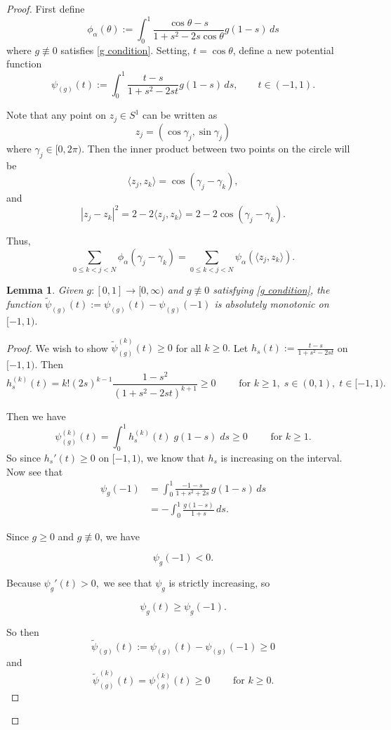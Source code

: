 \documentclass{article}
\newtheorem{lemma}[theorem]{Lemma}
\begin{document}
\begin{proof}
First define
\[
\phi_\alpha(\theta)
:=\int_0^1
\frac{\cos\theta-s}{1+s^2-2s\cos\theta}g(1-s)\,ds
\]
where $g\not\equiv0$ satisfies \eqref{g condition}. Setting, $t=\cos\theta$, define a new potential function
\[
\psi_{(g)}(t)
:=\int_0^1\frac{t-s}{1+s^2-2st}g(1-s)\,ds,
\qquad t\in(-1,1).
\]

Note that any point on $z_j\in S^1$ can be written as
\[
z_j=(\cos\gamma_j,\sin\gamma_j)
\]
where $\gamma_j\in [0,2\pi).$
Then the inner product between two points on the circle will be
\[
\langle z_j,z_k\rangle=\cos(\gamma_j-\gamma_k),
\]
and
\[
|z_j-z_k|^2
=2-2\langle z_j,z_k\rangle
=2-2\cos(\gamma_j-\gamma_k).
\]

Thus,
\[
\sum_{0\leq k<j<N}\phi_\alpha(\gamma_j-\gamma_k)
=\sum_{0\leq k<j<N}\psi_\alpha(\langle z_j,z_k\rangle).
\]

\begin{lemma}
  Given  $g: [0,1] \rightarrow [0,\infty) $ and $g\not\equiv0$  satisfying  \eqref{g condition}, the function $\widetilde{\psi}_{(g)}(t):= \psi_{(g)}(t)-\psi_{(g)}(-1) $ is absolutely monotonic on $[-1,1).$
\end{lemma}
\begin{proof}
    We wish to show $\widetilde{\psi}_{(g)}^{(k)}(t)\geq 0$ for all $k\geq 0.$  Let $h_s(t):=\frac{t-s}{1+s^2-2st} $ on $[-1,1).$ Then 
    \[h_s^{(k)}(t)
=k!(2s)^{k-1}\frac{1-s^2}{(1+s^2-2st)^{k+1}}
\geq 0 \qquad \text{ for } k\geq 1, \; s\in (0,1), \;t\in [-1,1).\]

Then we have \[\psi_{(g)}^{(k)}(t)=\int_0^1 h_s^{(k)}(t) \;g(1-s) \;ds\geq 0 \qquad \text{ for } k\geq 1.\]
So since $h_s'(t)\geq 0 $ on $[-1,1)$, we know that $h_s$ is increasing on the interval. 
Now see that
$$ \begin{aligned} \psi_g(-1) &= \int_0^1 \frac{-1-s}{1+s^2+2s}\,g(1-s)\,ds\\ &= -\int_0^1\frac{g(1-s)}{1+s}\,ds. \end{aligned} $$

Since \(g\ge0\) and \(g\not\equiv0\), we have

$$\psi_g(-1)<0. $$

Because $\psi_g'(t)>0, $ we see that $\psi_g$ is strictly increasing, so

$$ \psi_g(t)\ge\psi_g(-1). $$

So then $$\widetilde{\psi}_{(g)}(t):= \psi_{(g)}(t)-\psi_{(g)}(-1)\geq0$$ and $$ \widetilde{\psi}_{(g)}^{(k)}(t)= \psi_{(g)}^{(k)}(t)\geq 0 \qquad \text{ for }  k\geq 0 .$$
\end{proof}


\end{proof}
\end{document}
